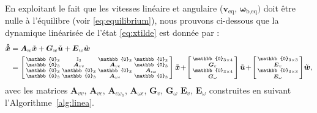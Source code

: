 En exploitant le fait que les vitesses linéaire et angulaire ($\boldsymbol{v}_{\text{eq}}$, $\boldsymbol{\omega}_{\text{b,eq}})$ doit être nulle à l'équilibre (voir \eqref{eq:equilibrium}), nous prouvons ci-dessous que la dynamique linéarisée de l'état \eqref{eq:xtilde} est donnée par : 
\begin{align}
\label{eq:lpv_linearisation}
 \boldsymbol{\dot{\tilde{x}}} &= \boldsymbol{A}_{w} \tilde{\boldsymbol{x}} + \boldsymbol{G}_{w} \tilde{\boldsymbol{u}} + \boldsymbol{E}_{w}  \tilde{\boldsymbol{w}} \\
 &= \smallmat{
     \mathbb{0}_{3} & \mathbb{I}_{3} & \mathbb{0}_{3} &\mathbb{0}_{3} \\
    \mathbb{0}_{3} & \boldsymbol{A}_{vv}  & \boldsymbol{A}_{v\epsilon}  & \mathbb{0}_{3}\\
    \mathbb{0}_{3} & \mathbb{0}_{3} & \mathbb{0}_{3} & \boldsymbol{A}_{\epsilon \omega} \\    
    \mathbb{0}_{3} & \mathbb{0}_{3} &  \boldsymbol{A}_{\omega \epsilon} & \mathbb{0}_{3}
    } \tilde{\boldsymbol{x}} \!+\!
    \smallmat{ \mathbb{0}_{3 \times 4} \\
     \boldsymbol{G}_{v}\\
     \mathbb{0}_{3 \times 4}\\
     \boldsymbol{G}_{\omega}
    } \tilde{\boldsymbol{u}}
    \!+\! \smallmat{
     \mathbb{0}_{3 \times 3} \\
     \boldsymbol{E}_{v} \\
     \mathbb{0}_{3 \times 3} \\
     \boldsymbol{E}_{\omega} 
     } \!\tilde{\boldsymbol{w}},
     \nonumber
\end{align}
%
avec les matrices $\boldsymbol{A}_{vv} $, $\boldsymbol{A}_{v\epsilon}$, $\boldsymbol{A}_{\epsilon \omega_{\text{b}}}$, $\boldsymbol{A}_{\omega \epsilon}$, $ \boldsymbol{G}_{v}$, $\boldsymbol{G}_{\omega}$ $\boldsymbol{E}_{v}$, $\boldsymbol{E}_{\omega}$ construites en suivant l'Algorithme~\ref{alg:linea}.

